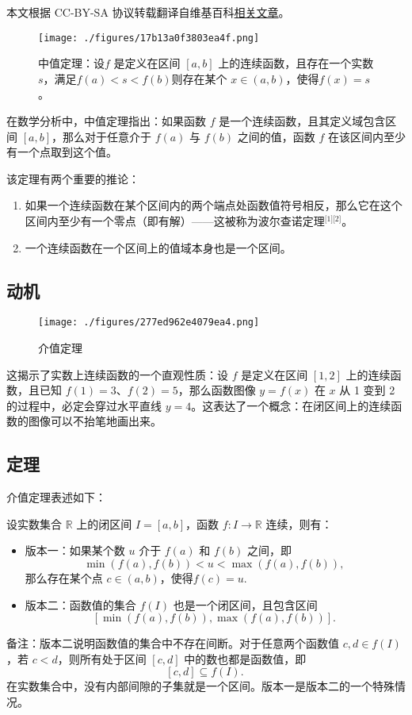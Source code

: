 
本文根据 CC-BY-SA 协议转载翻译自维基百科\href{https://en.wikipedia.org/wiki/Intermediate_value_theorem}{相关文章}。

\begin{figure}[ht]
\centering
\texttt{[image: ./figures/17b13a0f3803ea4f.png]}
\caption{中值定理：设$f$ 是定义在区间 $[a, b]$ 上的连续函数，且存在一个实数 $s$，满足$f(a) < s < f(b)$则存在某个 $x \in (a, b)$，使得$f(x) = s$。} \label{fig_JZDL_1}
\end{figure}
在数学分析中，中值定理指出：如果函数 $f$ 是一个连续函数，且其定义域包含区间 $[a, b]$，那么对于任意介于 $f(a)$ 与 $f(b)$ 之间的值，函数 $f$ 在该区间内至少有一个点取到这个值。

该定理有两个重要的推论：
\begin{enumerate}
\item 如果一个连续函数在某个区间内的两个端点处函数值符号相反，那么它在这个区间内至少有一个零点（即有解）——这被称为波尔查诺定理\(^\text{[1][2]}\)。
\item 一个连续函数在一个区间上的值域本身也是一个区间。
\end{enumerate}
\subsection{动机}
\begin{figure}[ht]
\centering
\texttt{[image: ./figures/277ed962e4079ea4.png]}
\caption{介值定理} \label{fig_JZDL_2}
\end{figure}
这揭示了实数上连续函数的一个直观性质：设 $f$ 是定义在区间 $[1, 2]$ 上的连续函数，且已知 $f(1) = 3$、$f(2) = 5$，那么函数图像 $y = f(x)$ 在 $x$ 从 1 变到 2 的过程中，必定会穿过水平直线 $y = 4$。这表达了一个概念：在闭区间上的连续函数的图像可以不抬笔地画出来。
\subsection{定理}
介值定理表述如下：

设实数集合 $\mathbb{R}$ 上的闭区间 $I = [a, b]$，函数 $f: I \to \mathbb{R}$ 连续，则有：

\begin{itemize}
\item 版本一：如果某个数 $u$ 介于 $f(a)$ 和 $f(b)$ 之间，即
$$
\min(f(a), f(b)) < u < \max(f(a), f(b)),~
$$
那么存在某个点 $c \in (a, b)$，使得$f(c) = u$.
\item 版本二：函数值的集合 $f(I)$ 也是一个闭区间，且包含区间
$$
[\min(f(a), f(b)), \max(f(a), f(b))].~
$$
\end{itemize}
备注：版本二说明函数值的集合中不存在间断。对于任意两个函数值 $c, d \in f(I)$，若 $c < d$，则所有处于区间 $[c, d]$ 中的数也都是函数值，即
$$
[c, d] \subseteq f(I).~
$$
在实数集合中，没有内部间隙的子集就是一个区间。版本一是版本二的一个特殊情况。
